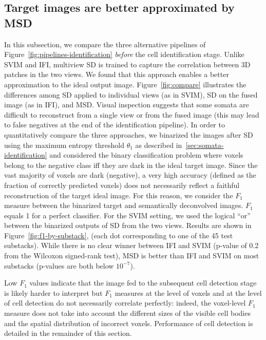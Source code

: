 \documentclass[smallextended]{svjour3}       %
\begin{document}
\subsection{Target images are better approximated by MSD}
\label{sec:MSD-is-better}
In this subsection, we compare the three alternative pipelines of
Figure~\ref{fig:pipelines-identification} \textit{before} the cell
identification stage. Unlike SVIM and IFI, multiview SD is trained to
capture the correlation between 3D patches in the two views. We found
that this approach enables a better approximation to the ideal output
image.  Figure~\ref{fig:compare} illustrates the differences among SD
applied to individual views (as in SVIM), SD on the fused image (as in
IFI), and MSD. Visual inspection suggests that some somata are
difficult to reconstruct from a single view or from the fused image
(this may lead to false negatives at the end of the identification
pipeline). In order to quantitatively compare the three approaches, we
binarized the images after SD using the maximum entropy threshold
$\theta_1$ as described in~\ref{sec:somata-identification} and
considered the binary classification problem where voxels belong to
the negative class iff they are dark in the ideal target
image. Since the vast majority of voxels are dark (negative), a very
high accuracy (defined as the fraction of correctly predicted voxels)
does not necessarily reflect a faithful reconstruction of the target
ideal image. For this reason, we consider the
$F_1$ measure between the binarized target and semantically
deconvolved images. $F_1$ equals 1 for a perfect classifier.  For the
SVIM setting, we used the logical ``or'' between the binarized
outputs of SD from the two views. Results are shown in
Figure~\ref{fig:f1-by-substack}, (each dot corresponding to one of the
45 test substacks).  While there is no clear winner between IFI and
SVIM (p-value of 0.2 from the Wilcoxon signed-rank test),
MSD is better than IFI and SVIM on most substacks (p-values are both
below $10^{-7}$).

Low $F_1$ values indicate that the image fed to the subsequent cell
detection stage is likely harder to interpret but $F_1$ measures at the
level of voxels and at the level of cell detection do not necessarily
correlate perfectly: indeed, the voxel-level $F_1$ measure does not take
into account the different sizes of the visible cell bodies and the
spatial distribution of incorrect voxels. Performance of cell
detection is detailed in the remainder of this section.
\end{document}
